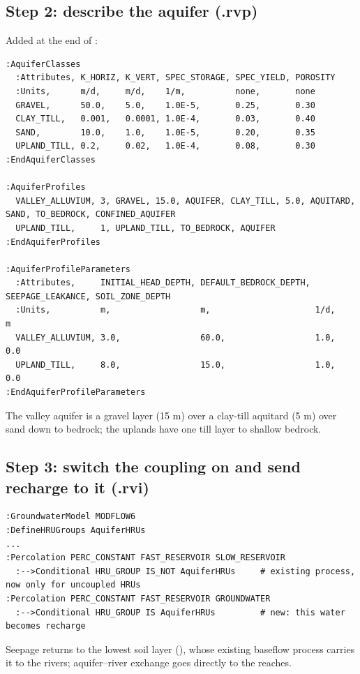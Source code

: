 \subsection{Step 2: describe the aquifer (.rvp)}
Added at the end of :
\begin{lstlisting}
:AquiferClasses
  :Attributes, K_HORIZ, K_VERT, SPEC_STORAGE, SPEC_YIELD, POROSITY
  :Units,      m/d,     m/d,    1/m,          none,       none
  GRAVEL,      50.0,    5.0,    1.0E-5,       0.25,       0.30
  CLAY_TILL,   0.001,   0.0001, 1.0E-4,       0.03,       0.40
  SAND,        10.0,    1.0,    1.0E-5,       0.20,       0.35
  UPLAND_TILL, 0.2,     0.02,   1.0E-4,       0.08,       0.30
:EndAquiferClasses

:AquiferProfiles
  VALLEY_ALLUVIUM, 3, GRAVEL, 15.0, AQUIFER, CLAY_TILL, 5.0, AQUITARD, SAND, TO_BEDROCK, CONFINED_AQUIFER
  UPLAND_TILL,     1, UPLAND_TILL, TO_BEDROCK, AQUIFER
:EndAquiferProfiles

:AquiferProfileParameters
  :Attributes,     INITIAL_HEAD_DEPTH, DEFAULT_BEDROCK_DEPTH, SEEPAGE_LEAKANCE, SOIL_ZONE_DEPTH
  :Units,          m,                  m,                     1/d,              m
  VALLEY_ALLUVIUM, 3.0,                60.0,                  1.0,              0.0
  UPLAND_TILL,     8.0,                15.0,                  1.0,              0.0
:EndAquiferProfileParameters
\end{lstlisting}
The valley aquifer is a gravel layer (15 m) over a clay-till aquitard (5 m) over sand down to bedrock; the uplands have one
till layer to shallow bedrock.

\subsection{Step 3: switch the coupling on and send recharge to it (.rvi)}
\par\noindent\begin{minipage}{\linewidth}
\begin{lstlisting}
:GroundwaterModel MODFLOW6
:DefineHRUGroups AquiferHRUs
...
:Percolation PERC_CONSTANT FAST_RESERVOIR SLOW_RESERVOIR
  :-->Conditional HRU_GROUP IS_NOT AquiferHRUs     # existing process, now only for uncoupled HRUs
:Percolation PERC_CONSTANT FAST_RESERVOIR GROUNDWATER
  :-->Conditional HRU_GROUP IS AquiferHRUs         # new: this water becomes recharge
\end{lstlisting}
\end{minipage}\par\smallskip
Seepage returns to the lowest soil layer (), whose existing baseflow process carries it to the rivers;
aquifer--river exchange goes directly to the reaches.

